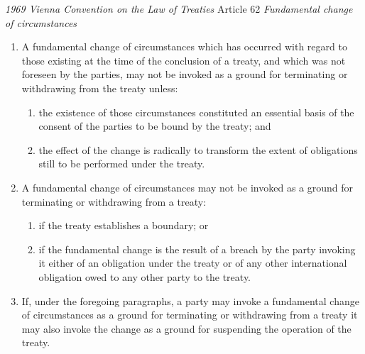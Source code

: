 \begin{conventiondetails}{\textit{1969 Vienna Convention on the Law of Treaties} Article 62}
    \flushleft
    \textit{Fundamental change of circumstances}

    \begin{enumerate}
        \item A fundamental change of circumstances which has occurred with regard to those existing at the 
        time of the conclusion of a treaty, and which was not foreseen by the parties, may not be invoked as a ground for terminating or withdrawing from the treaty unless:
        \begin{enumerate}[label=(\alph*)]
            \item the existence of those circumstances constituted an essential basis of the consent of the parties to be bound by the treaty; and
            \item the effect of the change is radically to transform the extent of obligations still to be performed under the treaty.
        \end{enumerate}
        \item A fundamental change of circumstances may not be invoked as a ground for terminating or 
        withdrawing from a treaty:
        \begin{enumerate}[label=(\alph*)]
            \item if the treaty establishes a boundary; or 
            \item if the fundamental change is the result of a breach by the party invoking it either of an obligation under the treaty or of any other international obligation owed to any other party to the treaty.
        \end{enumerate}
        \item If, under the foregoing paragraphs, a party may invoke a fundamental change of circumstances as a ground for terminating or withdrawing from a treaty it may also invoke the change as a ground for suspending the operation of the treaty.
    \end{enumerate}
\end{conventiondetails}

